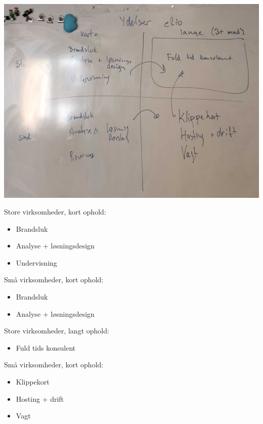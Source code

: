 \documentclass[11pt]{report}
\begin{document}
\begin{center} 
\includegraphics{kunde-segmenter}
\end{center}
Store virksomheder, kort ophold:
\begin{itemize}
  \item Brandsluk
  \item Analyse + løsningsdesign
  \item Undervisning
\end{itemize}
Små virksomheder, kort ophold:
\begin{itemize}
  \item Brandsluk
  \item Analyse + løsningsdesign
\end{itemize}
Store virksomheder, langt ophold:
\begin{itemize}
  \item Fuld tids konsulent
\end{itemize}
Små virksomheder, kort ophold:
\begin{itemize}
  \item Klippekort
  \item Hosting + drift
  \item Vagt
\end{itemize}

\newpage
\end{document}
